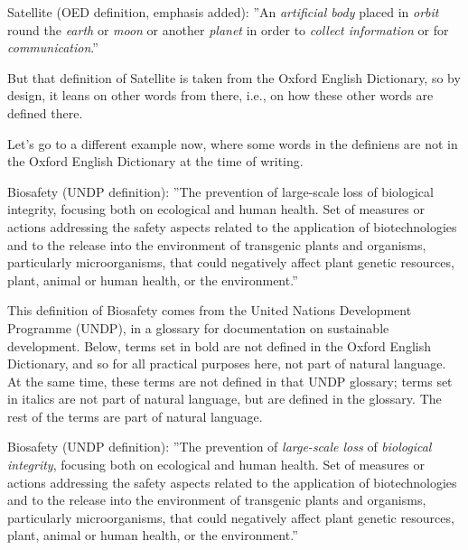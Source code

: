 \begin{svgraybox}
Satellite (OED definition, emphasis added): ''An \textit{artificial body} placed in \textit{orbit} round the \textit{earth} or \textit{moon} or another \textit{planet} in order to \textit{collect information} or for \textit{communication}.'' \cite{def-satellite}
\end{svgraybox}

But that definition of Satellite is taken from the Oxford English Dictionary, so by design, it leans on other words from there, i.e., on how these other words are defined there.

Let's go to a different example now, where some words in the definiens are not in the Oxford English Dictionary at the time of writing.

\begin{svgraybox}
Biosafety (UNDP definition): ''The prevention of large-scale loss of biological integrity, focusing both on ecological and human health. Set of measures or actions addressing the safety aspects related to the application of biotechnologies and to the release into the environment of transgenic plants and organisms, particularly microorganisms, that could negatively affect plant genetic resources, plant, animal or human health, or the environment.'' \cite{undp-glossary}
\end{svgraybox}

This definition of Biosafety comes from the United Nations Development Programme (UNDP), in a glossary for documentation on sustainable development. Below, terms set in bold are not defined in the Oxford English Dictionary, and so for all practical purposes here, not part of natural language. At the same time, these terms are not defined in that UNDP glossary; terms set in italics are not part of natural language, but are defined in the glossary. The rest of the terms are part of natural language.

\begin{svgraybox}
Biosafety (UNDP definition): ''The prevention of \textit{large-scale loss} of \textit{biological integrity}, focusing both on ecological and human health. Set of measures or actions addressing the safety aspects related to the application of biotechnologies and to the release into the environment of transgenic plants and organisms, particularly microorganisms, that could negatively affect plant genetic resources, plant, animal or human health, or the environment.'' \cite{undp-glossary}
\end{svgraybox}

